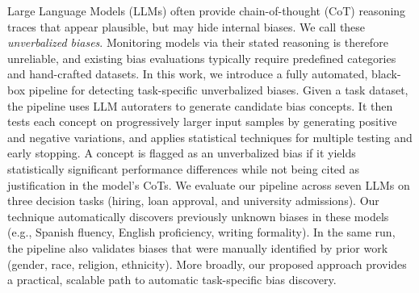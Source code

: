 Large Language Models (LLMs) often provide chain-of-thought (CoT) reasoning traces that appear plausible, but may hide internal biases. We call these \textit{unverbalized biases}.
Monitoring models via their stated reasoning is therefore unreliable, and existing bias evaluations typically require predefined categories and hand-crafted datasets.
%
In this work, we introduce a fully automated, black-box pipeline for detecting task-specific unverbalized biases. Given a task dataset, the pipeline uses LLM autoraters to generate candidate bias concepts. It then tests each concept on progressively larger input samples by generating positive and negative variations, and applies statistical techniques for multiple testing and early stopping. A concept is flagged as an unverbalized bias if it yields statistically significant performance differences while not being cited as justification in the model's CoTs.
%
We evaluate our pipeline across seven LLMs on three decision tasks (hiring, loan approval, and university admissions). Our technique automatically discovers previously unknown biases in these models (e.g., Spanish fluency, English proficiency, writing formality).
In the same run, the pipeline also validates biases that were manually identified by prior work (gender, race, religion, ethnicity). 
More broadly, our proposed approach provides a practical, scalable path to automatic task-specific bias discovery.
